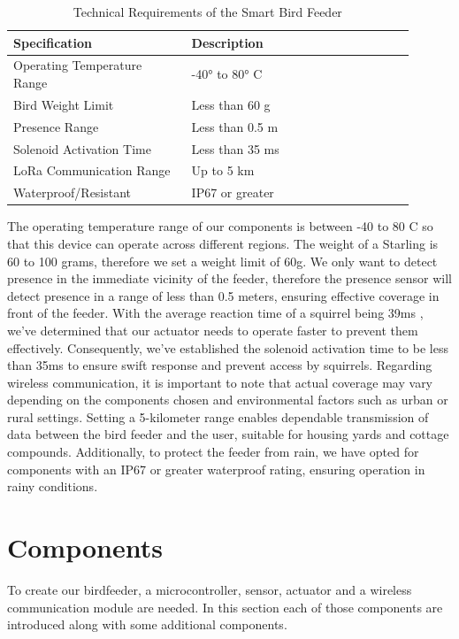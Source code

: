 \documentclass[12pt,a4paper]{article}
\begin{document}
\begin{table}[h]
\centering
\begin{tabular}{|p{0.4\linewidth}|p{0.5\linewidth}|}
\hline
\textbf{Specification} & \textbf{Description} \\ \hline
Operating Temperature Range & -40° to 80° C \\ \hline
Bird Weight Limit & Less than 60 g \\ \hline
Presence Range & Less than 0.5 m \\ \hline
Solenoid Activation Time & Less than 35 ms \\ \hline
LoRa Communication Range & Up to 5 km \\ \hline
Waterproof/Resistant & IP67 or greater \\ \hline
\end{tabular}
\caption{Technical Requirements of the Smart Bird Feeder}
\label{tab:technical_requirements}
\end{table}

The operating temperature range of our components is between -40 to 80 C so that this device can operate across different regions. The weight of a Starling is 60 to 100 grams, therefore we set a weight limit of 60g\cite{inaturalist}. We only want to detect presence in the immediate vicinity of the feeder, therefore the presence sensor will detect presence in a range of less than 0.5 meters, ensuring effective coverage in front of the feeder. With the average reaction time of a squirrel being 39ms \cite{gatewaytoairguns}, we've determined that our actuator needs to operate faster to prevent them effectively. Consequently, we've established the solenoid activation time to be less than 35ms to ensure swift response and prevent access by squirrels. Regarding wireless communication, it is important to note that actual coverage may vary depending on the components chosen and environmental factors such as urban or rural settings. Setting a 5-kilometer range enables dependable transmission of data between the bird feeder and the user, suitable for housing yards and cottage compounds. Additionally, to protect the feeder from rain, we have opted for components with an IP67 or greater waterproof rating, ensuring operation in rainy conditions.


\section{Components}

To create our birdfeeder, a microcontroller, sensor, actuator and a wireless communication module are needed. In this section each of those components are introduced along with some additional components. 
\end{document}
